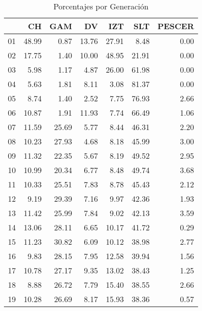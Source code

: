 \documentclass[12pt]{article}
\begin{document}
\begin{table}[ht]
\centering
\caption{Porcentajes por Generación} 
\begin{tabular}{rrrrrrr}
  \hline
 & CH & GAM & DV & IZT & SLT & PESCER \\ 
  \hline
01 & 48.99 & 0.87 & 13.76 & 27.91 & 8.48 & 0.00 \\ 
  02 & 17.75 & 1.40 & 10.00 & 48.95 & 21.91 & 0.00 \\ 
  03 & 5.98 & 1.17 & 4.87 & 26.00 & 61.98 & 0.00 \\ 
  04 & 5.63 & 1.81 & 8.11 & 3.08 & 81.37 & 0.00 \\ 
  05 & 8.74 & 1.40 & 2.52 & 7.75 & 76.93 & 2.66 \\ 
  06 & 10.87 & 1.91 & 11.93 & 7.74 & 66.49 & 1.06 \\ 
  07 & 11.59 & 25.69 & 5.77 & 8.44 & 46.31 & 2.20 \\ 
  08 & 10.23 & 27.93 & 4.68 & 8.18 & 45.99 & 3.00 \\ 
  09 & 11.32 & 22.35 & 5.67 & 8.19 & 49.52 & 2.95 \\ 
  10 & 10.99 & 20.34 & 6.77 & 8.48 & 49.74 & 3.68 \\ 
  11 & 10.33 & 25.51 & 7.83 & 8.78 & 45.43 & 2.12 \\ 
  12 & 9.19 & 29.39 & 7.16 & 9.97 & 42.36 & 1.93 \\ 
  13 & 11.42 & 25.99 & 7.84 & 9.02 & 42.13 & 3.59 \\ 
  14 & 13.06 & 28.11 & 6.65 & 10.17 & 41.72 & 0.29 \\ 
  15 & 11.23 & 30.82 & 6.09 & 10.12 & 38.98 & 2.77 \\ 
  16 & 9.83 & 28.15 & 7.95 & 12.58 & 39.94 & 1.56 \\ 
  17 & 10.78 & 27.17 & 9.35 & 13.02 & 38.43 & 1.25 \\ 
  18 & 8.88 & 26.72 & 7.79 & 15.40 & 38.55 & 2.66 \\ 
  19 & 10.28 & 26.69 & 8.17 & 15.93 & 38.36 & 0.57 \\ 
   \hline
\end{tabular}
\end{table}
\end{document}
